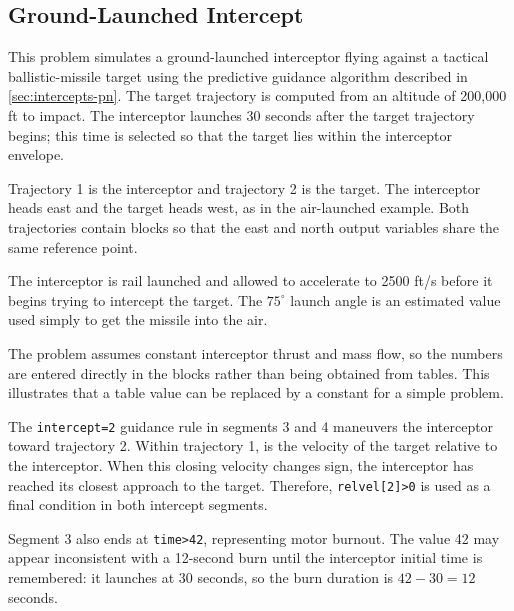 \subsection{Ground-Launched Intercept}\label{sec:example-ground-intercept}

This problem simulates a ground-launched interceptor flying against a tactical
ballistic-missile target using the predictive guidance algorithm described in
\cref{sec:intercepts-pn}.  The target trajectory is computed
from an altitude of 200,000 ft to impact.  The interceptor launches 30 seconds after
the target trajectory begins; this time is selected so that the target lies within the
interceptor envelope.




Trajectory 1 is the interceptor and trajectory 2 is the target.  The interceptor heads
east and the target heads west, as in the air-launched example.  Both trajectories
contain  blocks so that the east and north output variables
share the same reference point.

The interceptor is rail launched and allowed to accelerate to 2500 ft/s before it
begins trying to intercept the target.  The $75^\circ$ launch angle is an estimated
value used simply to get the missile into the air.

The problem assumes constant interceptor thrust and mass flow, so the numbers are
entered directly in the  blocks rather than being obtained from
tables.  This illustrates that a table value can be replaced by a constant for a simple
problem.

The \texttt{intercept=2} guidance rule in segments 3 and 4 maneuvers the
interceptor toward trajectory 2.  Within trajectory 1,  is the
velocity of the target relative to the interceptor.  When this closing velocity changes
sign, the interceptor has reached its closest approach to the target.  Therefore,
\texttt{relvel[2]>0} is used as a final condition in both intercept segments.

Segment 3 also ends at \texttt{time>42}, representing motor burnout.  The value 42
may appear inconsistent with a 12-second burn until the interceptor initial time is
remembered: it launches at 30 seconds, so the burn duration is $42-30=12$ seconds.


